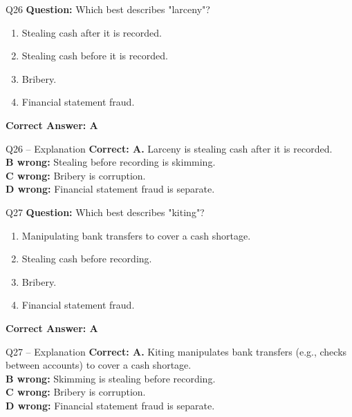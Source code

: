 \documentclass[aspectratio=169,10pt]{beamer}
\begin{document}
	\begin{frame}[t]{Q26}
		\small
		\textbf{Question:} Which best describes "larceny"?
		\begin{enumerate}[label=\Alph*.,itemsep=1pt,topsep=2pt]
			\item Stealing cash after it is recorded.
			\item Stealing cash before it is recorded.
			\item Bribery.
			\item Financial statement fraud.
		\end{enumerate}
		\vspace{4pt}
		\textbf{Correct Answer: A}
	\end{frame}
	
	\begin{frame}[t]{Q26 -- Explanation}
		\small
		\textbf{Correct: A.} Larceny is stealing cash after it is recorded. \\[4pt]
		\textbf{B wrong:} Stealing before recording is skimming. \\[2pt]
		\textbf{C wrong:} Bribery is corruption. \\[2pt]
		\textbf{D wrong:} Financial statement fraud is separate.
	\end{frame}
	
	\begin{frame}[t]{Q27}
		\small
		\textbf{Question:} Which best describes "kiting"?
		\begin{enumerate}[label=\Alph*.,itemsep=1pt,topsep=2pt]
			\item Manipulating bank transfers to cover a cash shortage.
			\item Stealing cash before recording.
			\item Bribery.
			\item Financial statement fraud.
		\end{enumerate}
		\vspace{4pt}
		\textbf{Correct Answer: A}
	\end{frame}
	
	\begin{frame}[t]{Q27 -- Explanation}
		\small
		\textbf{Correct: A.} Kiting manipulates bank transfers (e.g., checks between accounts) to cover a cash shortage. \\[4pt]
		\textbf{B wrong:} Skimming is stealing before recording. \\[2pt]
		\textbf{C wrong:} Bribery is corruption. \\[2pt]
		\textbf{D wrong:} Financial statement fraud is separate.
	\end{frame}
	
\end{document}
